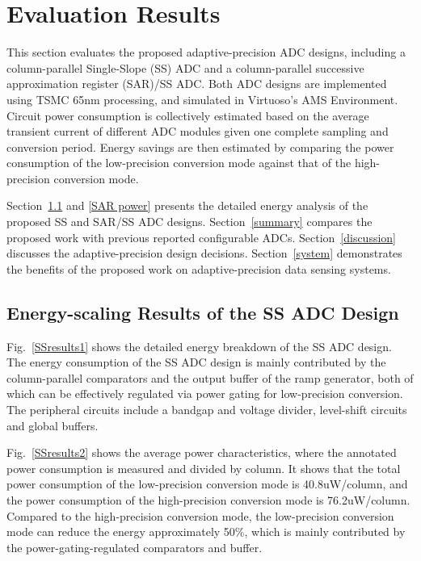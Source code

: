 \section{Evaluation Results}\label{result}

This section evaluates the proposed adaptive-precision ADC 
designs, including a column-parallel Single-Slope (SS) ADC and a column-parallel successive 
approximation register (SAR)/SS ADC. Both ADC designs are implemented using TSMC 65nm processing,
and simulated in Virtuoso’s AMS Environment. Circuit power consumption is collectively estimated
based on the average transient current of different ADC modules given one complete sampling and 
conversion period. Energy savings are then estimated by comparing the power consumption of the
low-precision conversion mode against that of the high-precision conversion mode. 

Section~\ref{SS power} and \ref{SAR power} presents the detailed energy analysis of the 
proposed SS and SAR/SS ADC designs. 
Section~\ref{summary} compares the proposed work with previous reported configurable ADCs.
Section~\ref{discussion} discusses the adaptive-precision design decisions. 
Section~\ref{system} demonstrates the benefits of the proposed work on adaptive-precision data sensing 
systems.

\subsection{Energy-scaling Results of the SS ADC Design}\label{SS power}

Fig.~\ref{SSresults1} shows the detailed energy breakdown of the SS ADC design. 
The energy consumption of the SS ADC design is mainly contributed by the column-parallel comparators 
and the output buffer of the ramp generator, both of which can be effectively regulated via power gating 
for low-precision conversion. The peripheral circuits include a bandgap and voltage divider, level-shift 
circuits and global buffers.

Fig.~\ref{SSresults2} shows the average power characteristics, where the annotated power consumption is measured 
and divided by column. It shows that the total power consumption of the low-precision conversion mode is 
40.8uW/column, and the power consumption of the high-precision conversion mode is 76.2uW/column. 
Compared to the high-precision conversion mode, the low-precision conversion mode can reduce the energy approximately 
50\%, which is mainly contributed by the power-gating-regulated comparators and buffer.

